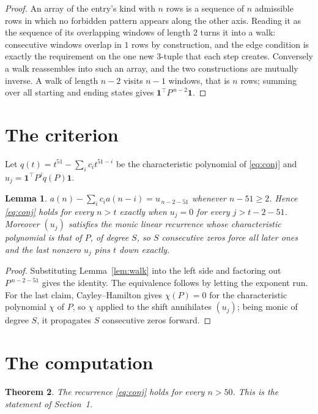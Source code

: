 \documentclass[11pt,a4paper]{article}
\theoremstyle{plain}
\newtheorem{theorem}{Theorem}
\newtheorem{lemma}[theorem]{Lemma}
\theoremstyle{definition}
\begin{document}
\begin{proof}
An array of the entry's kind with $n$ rows is a sequence of $n$ admissible rows in
which no forbidden pattern appears along the other axis. Reading it as the sequence of its
overlapping windows of length $2$ turns it into a walk: consecutive windows overlap in
$1$ rows by construction, and the edge condition is exactly the requirement on the one
new $3$-tuple that each step creates. Conversely a walk reassembles into such an array,
and the two constructions are mutually inverse. A walk of length $n-2$ visits $n-1$
windows, that is $n$ rows; summing over all starting and ending states gives
$\mathbf{1}^{\!\top}P^{\,n-2}\mathbf{1}$.
\end{proof}

\section{The criterion}

Let $q(t)=t^{51}-\sum_i c_i t^{51-i}$ be the characteristic polynomial of
\eqref{eq:conj} and $u_j=\mathbf{1}^{\!\top}P^{j}q(P)\mathbf{1}$.

\begin{lemma}\label{lem:crit}
$a(n)-\sum_i c_i a(n-i)=u_{\,n-2-51}$ whenever $n-51\ge2$. Hence
\eqref{eq:conj} holds for every $n>t$ exactly when $u_j=0$ for every
$j>t-2-51$. Moreover $(u_j)$ satisfies the monic linear recurrence whose
characteristic polynomial is that of $P$, of degree $S$, so $S$ consecutive zeros force all
later ones and the last nonzero $u_j$ pins $t$ down exactly.
\end{lemma}

\begin{proof}
Substituting Lemma~\ref{lem:walk} into the left side and factoring out
$P^{\,n-2-51}$ gives the identity. The equivalence follows by letting the exponent
run. For the last claim, Cayley--Hamilton gives $\chi(P)=0$ for the characteristic
polynomial $\chi$ of $P$, so $\chi$ applied to the shift annihilates $(u_j)$; being monic of
degree $S$, it propagates $S$ consecutive zeros forward.
\end{proof}

\section{The computation}

\begin{theorem}
The recurrence \eqref{eq:conj} holds for every $n>50$. This is the statement of
Section~1.
\end{theorem}
\end{document}
